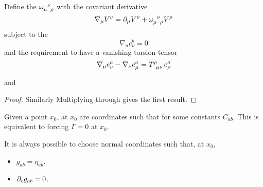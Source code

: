 \documentclass{article}
\begin{document}
\begin{definition}
Define the  $\omega\indices{_\mu^\nu_\rho}$ with the covariant derivative 
\[
\nabla_\mu V^\nu = \del_\mu V^\nu + \omega\indices{_\mu^\nu_\rho} V^\rho
\]
subject to the 
\[
\nabla_a e^b_\nu = 0
\]
and the requirement to have a vanishing torsion tensor 
\[
\nabla_\mu e^a_\nu - \nabla_\nu e^a_\mu = T\indices{^\rho_\mu_\nu} e^a_\rho
\]
\end{definition}

\begin{prop}
and 
\eq{
\omega_{\mu\rho\sigma} = -\omega_{\mu\sigma\rho}
}
\end{prop}
\begin{proof}
Similarly 
Multiplying through gives the first result. 
\end{proof}


\begin{definition}
Given a point $x_0$,  at $x_0$ are coordinates such that 
for some constants $C_{ab}$. This is equivalent to forcing $\Gamma = 0$ at $x_0$. 
\end{definition}

\begin{lemma}
It is always possible to choose normal coordinates such that, at $x_0$, 
\begin{itemize}
    \item $g_{ab} = \eta_{ab}$.
    \item $\partial_c g_{ab} = 0$.
\end{itemize}
\end{lemma}
\end{document}
